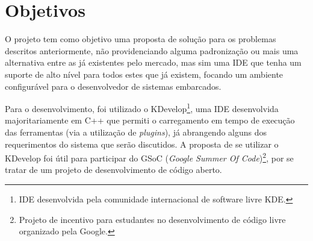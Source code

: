 \section{Objetivos}

O projeto tem como objetivo uma proposta de solução para os problemas descritos anteriormente, não providenciando alguma padronização ou mais uma alternativa entre as já existentes pelo mercado, mas sim uma IDE que tenha um suporte de alto nível para todos estes que já existem, focando um ambiente configurável para o desenvolvedor de sistemas embarcados.
\iffalse
visando um ambiente configurável e mutável a suas necessidades.
\fi

Para o desenvolvimento, foi utilizado o KDevelop\footnote{IDE desenvolvida pela comunidade internacional de software livre KDE.}, uma IDE desenvolvida majoritariamente em C++ que permiti o carregamento em tempo de execução das ferramentas (via a utilização de \textit{plugins}), já abrangendo alguns dos requerimentos do sistema que serão discutidos. A proposta de se utilizar o KDevelop foi útil para participar do GSoC (\textit{Google Summer Of Code})\footnote{Projeto de incentivo para estudantes no desenvolvimento de código livre organizado pela Google.}, por se tratar de um projeto de desenvolvimento de código aberto.

\iffalse
O objetivo geral deve responder as seguintes perguntas:
1) O que a sua organização deseja realizar com o Projeto?
2) Qual problema em especial se quer solucionar?
3) Que mudanças se quer alcançar?
4) Que diferença o projeto quer fazer?

Deve ser escrito em tempo infinitivo (por exemplo: ampliar, capacitar, entre outros) e redigido com claridade. O objetivo precisa ser alcançável, não pode ser genérico, de forma que o projeto não consiga resolver (ex: terminar com a fome no mundo). Por outro lado deve ser ousado, capaz de sinalizar mudanças mais profundas que poderão ser alcançadas pelo projeto a médio e longo prazo.
\fi

